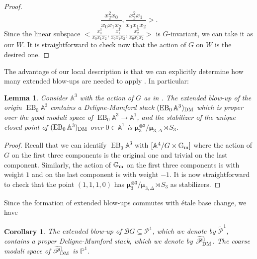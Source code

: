 \documentclass{amsart}
\newcommand{\bA}{\mathbb{A}}
\newcommand{\bG}{\mathbb{G}}
\newcommand{\bP}{\mathbb{P}}
\newcommand{\sP}{\mathscr{P}}
\newcommand{\cB}{\mathcal{B}}
\newcommand{\Gm}{\bG_{{\rm m}}}
\newcommand{\bmu}{\bm{\mu}}
\newcommand{\dm}{{\rm DM}}
\DeclareMathOperator{\EB}{EB}
\newtheorem{Lemma}[theorem]{Lemma}
\newtheorem{Cor}[theorem]{Corollary}
\theoremstyle{definition}
\theoremstyle{definition}
\begin{document}
{\begin{proof}
\[\frac{x_2^2x_0}{x_0x_1x_2},
\frac{x_2^2x_1}{x_0x_1x_2}>.
\] Since the linear subspace $<\frac{x_0^3}{x_0x_1x_2}, \frac{x_1^3}{x_0x_1x_2}, \frac{x_2^3}{x_0x_1x_2}>$ is $G$-invariant, we can take it as our $W$. It is straightforward to check now that the action of $G$ on $W$ is the desired one.  
\end{proof}
The advantage of our local description is that we can explicitly determine how many extended blow-ups are needed to apply . In particular:
\begin{Lemma}
Consider $\bA^3$ with the action of $G$ as in .
The extended blow-up of the origin $\EB_0\bA^3$ contains a Deligne-Mumford stack $(\EB_0\bA^3)_\dm$ which is proper over the good moduli space of $\EB_0\bA^3\to \bA^1$, and the stabilizer of the unique closed point of $(\EB_0\bA^3)_\dm$ over $0\in \bA^1$ is $\bmu_3^{\otimes 3}/\bmu_{3,\Delta}\rtimes S_3$.
\end{Lemma}
\begin{proof}Recall that we can identify $\EB_0\bA^3$ with $[\bA^4/G\times \Gm]$ where the action of $G$ on the first three components is the original one and trivial on the last component. Similarly, the action of $\Gm$ on the first three components is with weight $1$ and on the last component is with weight $-1$. It is now straightforward to check that the point $(1,1,1,0)$ has $\bmu_3^{\otimes 3}/\bmu_{3,\Delta}\rtimes S_3$ as stabilizers. 
\end{proof}
Since the formation of extended blow-ups commutes with \'etale base change, we have
\begin{Cor}
    The extended blow-up of $\cB G \subseteq \sP^1$, which we denote by $\widetilde{\sP}^1$, contains a
    proper Deligne-Mumford stack, which we denote by $\widetilde{\sP}^1_\dm$. The coarse moduli space of $\widetilde{\sP}^1_\dm$ is $\bP^1$. 
\end{Cor}
}
\end{document}
